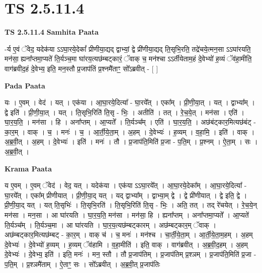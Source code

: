 \documentclass[17pt]{extarticle}
\begin{document}
\section*{ TS 2.5.11.4 }

\textbf{TS 2.5.11.4 } \newline
\textbf{Samhita Paata} \newline

-र्य ए॒वं ॅवेद॒ यदेक॑या ऽऽघा॒रये॒देकां᳚ प्रीणीया॒द्यद् द्वाभ्यां॒ द्वे प्री॑णीया॒द्यद् ति॒सृभि॒रति॒ तद्रे॑चये॒त्मन॒सा ऽऽघा॑रयति॒ मन॑सा॒ ह्यना᳚प्तमा॒प्यते॑ ति॒र्यञ्च॒मा घा॑रय॒त्यछ॑म्बट्कारं॒ ॅवाक् च॒ मन॑श्चा ऽऽर्तीयेताम॒हं दे॒वेभ्यो॑ ह॒व्यं ॅव॑हा॒मीति॒ वाग॑ब्रवीद॒हं दे॒वेभ्य॒ इति॒ मन॒स्तौ प्र॒जाप॑तिं प्र॒श्नमै॑ताꣳ॒॒ सो᳚ऽब्रवीत् - [  ] \newline

\textbf{Pada Paata} \newline

यः । ए॒वम् । वेद॑ । यत् । एक॑या । आ॒घा॒रये॒दित्या᳚ - घा॒रये᳚त् । एका᳚म् । प्री॒णी॒या॒त् । यत् । द्वाभ्या᳚म् । द्वे इति॑ । प्री॒णी॒या॒त् । यत् । ति॒सृभि॒रिति॑ ति॒सृ - भिः॒ । अतीति॑ । तत् । रे॒च॒ये॒त् । मन॑सा । एति॑ । घा॒र॒य॒ति॒ । मन॑सा । हि । अना᳚प्तम् । आ॒प्यते᳚ । ति॒र्यञ्च᳚म् । एति॑ । घा॒र॒य॒ति॒ । अछ॑बंट्कार॒मित्यछ॑बंट् - का॒र॒म् । वाक् । च॒ । मनः॑ । च॒ । आ॒र्ती॒ये॒ता॒म् । अ॒हम् । दे॒वेभ्यः॑ । ह॒व्यम् । व॒हा॒मि॒ । इति॑ । वाक् । अ॒ब्र॒वी॒त् । अ॒हम् । दे॒वेभ्यः॑ । इति॑ । मनः॑ । तौ । प्र॒जाप॑ति॒मिति॑ प्र॒जा - प॒ति॒म् । प्र॒श्नम् । ऐ॒ता॒म् । सः । अ॒ब्र॒वी॒त् ।  \newline


\textbf{Krama Paata} \newline

य ए॒वम् । ए॒वम् ॅवेद॑ । वेद॒ यत् । यदेक॑या । एक॑या ऽऽघा॒रये᳚त् । आ॒घा॒रये॒देका᳚म् । आ॒घा॒रये॒दित्या᳚ - घा॒रये᳚त् । एका᳚म् प्रीणीयात् । प्री॒णी॒या॒द् यत् । यद् द्वाभ्या᳚म् । द्वाभ्या॒म् द्वे । द्वे प्री॑णीयात् । द्वे इति॒ द्वे । प्री॒णी॒या॒द् यत् । यत् ति॒सृभिः॑ । ति॒सृभि॒रति॑ । ति॒सृभि॒रिति॑ ति॒सृ - भिः॒ । अति॒ तत् । तद् रे॑चयेत् । रे॒च॒ये॒न् मन॑सा । मन॒सा । आ घा॑रयति । घा॒र॒य॒ति॒ मन॑सा । मन॑सा॒ हि । ह्यना᳚प्तम् । अना᳚प्तमा॒प्यते᳚ । आ॒प्यते॑ ति॒र्यञ्च᳚म् । ति॒र्यञ्च॒मा । आ घा॑रयति । घा॒र॒य॒त्यछ॑म्बट्कारम् । अछ॑म्बट्कार॒म् ॅवाक् । अछ॑म्बट्कार॒मित्यछ॑म्बट् - का॒र॒म् । वाक् च॑ । च॒ मनः॑ । मन॑श्च । चा॒र्ती॒ये॒ता॒म् । आ॒र्ती॒ये॒ता॒म॒हम् । अ॒हम् दे॒वेभ्यः॑ । दे॒वेभ्यो॑ ह॒व्यम् । ह॒व्यम् ॅव॑हामि । व॒हा॒मीति॑ । इति॒ वाक् । वाग॑ब्रवीत् । अ॒ब्र॒वी॒द॒हम् । अ॒हम् दे॒वेभ्यः॑ । दे॒वेभ्य॒ इति॑ । इति॒ मनः॑ । मन॒ स्तौ । तौ प्र॒जाप॑तिम् । प्र॒जाप॑तिम् प्र॒श्ञम् । प्र॒जाप॑ति॒मिति॑ प्र॒जा - प॒ति॒म् । प्र॒श्ञमै॑ताम् । ऐ॒ताꣳ॒॒ सः । सो᳚ऽब्रवीत् । अ॒ब्र॒वी॒त् प्र॒जाप॑तिः \newline
\end{document}
